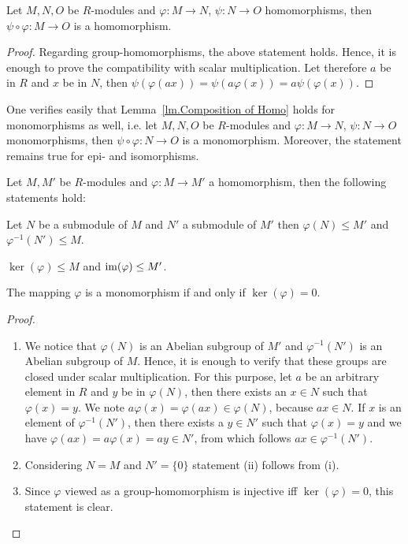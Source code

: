 \begin{lem}\label{lm.Composition of Homo} Let $M, N, O$ be $R$-modules and $\varphi\colon M\rightarrow N$, $\psi\colon N\rightarrow O$ homomorphisms, then $\psi\circ\varphi\colon M\rightarrow O$ is a homomorphism.
\end{lem}
\begin{proof}
Regarding group-homomorphisms, the above statement holds. Hence, it is enough to prove the compatibility with scalar multiplication. Let therefore $a$ be in $R$ and $x$ be in $N$, then $\psi(\varphi(ax))=\psi(a\varphi(x))=a\psi(\varphi(x))$.
\end{proof}

One verifies easily that Lemma~\ref{lm.Composition of Homo} holds for monomorphisms as well, i.e. let $M, N, O$ be $R$-modules and $\varphi\colon M\rightarrow N$, $\psi\colon N\rightarrow O$ monomorphisms, then $\psi\circ\varphi\colon N\rightarrow O$ is a monomorphism. Moreover, the statement remains true for epi- and isomorphisms.

\begin{lem}
Let $M,M'$ be $R$-modules and $\varphi\colon M\rightarrow M'$ a homomorphism, then the following statements hold:
\begin{exlist}
\item Let $N$ be a submodule of $M$ and $N'$ a submodule of $M'$ then $\varphi(N)\leq M'$ and $\varphi^{-1}(N') \leq M$.
\item $\ker(\varphi)\leq M$ and $\operatorname{im}(\varphi)\leq M'$.
\item The mapping $\varphi$ is a monomorphism if and only if $\ker(\varphi)={0}$.
\end{exlist}
\end{lem}
\begin{proof}
\begin{enumerate}
\item We notice that $\varphi(N)$ is an Abelian subgroup of $M'$ and $\varphi^{-1}(N')$ is an Abelian subgroup of $M$. Hence, it is enough to verify that these groups are closed under scalar multiplication. For this purpose, let $a$ be an arbitrary element in $R$ and $y$ be in $\varphi(N)$, then there exists an $x\in N$ such that $\varphi(x)=y$. We note $a\varphi(x)=\varphi(ax)\in\varphi(N)$, because $ax\in N$. If $x$ is an element of $\varphi^{-1}(N')$, then there exists a $y\in N'$ such that $\varphi(x)=y$ and we have $\varphi(ax)=a\varphi(x)=ay\in N'$, from which follows $ax\in \varphi^{-1}(N')$.
\item Considering $N=M$ and $N'=\lbrace 0\rbrace$ statement (ii) follows from (i).
\item Since $\varphi$ viewed as a group-homomorphism is injective iff $\ker(\varphi)={0}$, this statement is clear.
\end{enumerate}
\end{proof}

